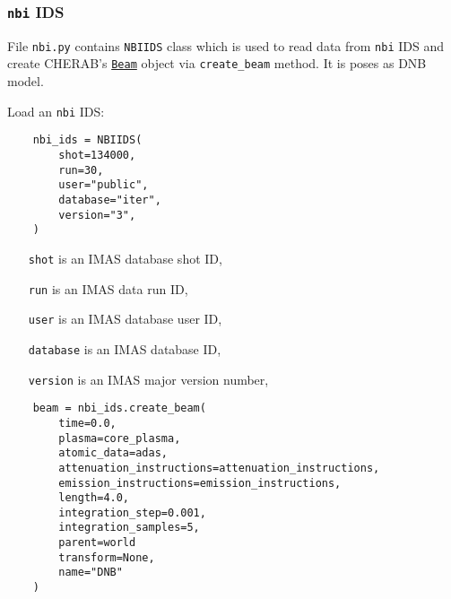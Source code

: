 \documentclass[../../main.tex]{subfiles}
\begin{document}
\subsubsection{\texttt{nbi} IDS}%
\label{sec:nbi_ids}

File \texttt{nbi.py} contains \texttt{NBIIDS} class which is used to read data from \texttt{nbi} IDS and create CHERAB's \href{https://cherab.github.io/documentation/plasmas/particle_beams.html?highlight=beam#cherab.core.Beam}{\texttt{Beam}} object via \texttt{create\_beam} method. It is poses as DNB model.

Load an \texttt{nbi} IDS:
\begin{verbatim}
    nbi_ids = NBIIDS(
        shot=134000,
        run=30,
        user="public",
        database="iter",
        version="3",
    )
\end{verbatim}

\begin{itemize}[align=left]
    \item[\texttt{shot}] is an IMAS database shot ID,
    \item[\texttt{run}] is an IMAS data run ID,
    \item[\texttt{user}] is an IMAS database user ID,
    \item[\texttt{database}] is an IMAS database ID,
    \item[\texttt{version}] is an IMAS major version number,
\end{itemize}

\begin{verbatim}
    beam = nbi_ids.create_beam(
        time=0.0,
        plasma=core_plasma,
        atomic_data=adas,
        attenuation_instructions=attenuation_instructions,
        emission_instructions=emission_instructions,
        length=4.0,
        integration_step=0.001,
        integration_samples=5,
        parent=world
        transform=None,
        name="DNB"
    )
\end{verbatim}
\end{document}
